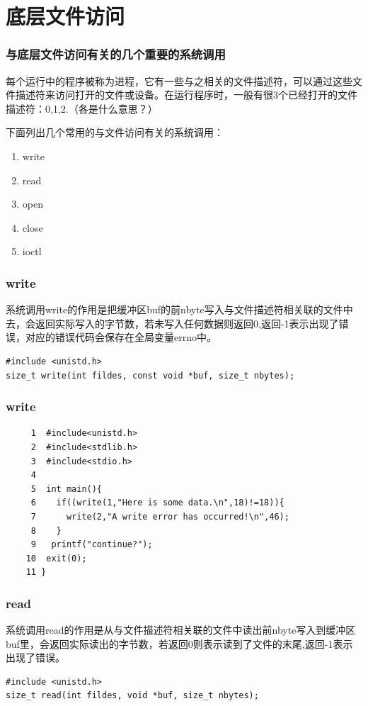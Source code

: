 \documentclass{beamer}
\begin{document}
\section{底层文件访问}
\begin{frame}
\frametitle{与底层文件访问有关的几个重要的系统调用}
每个运行中的程序被称为进程，它有一些与之相关的文件描述符，可以通过这些文件描述符来访问打开的文件或设备。在运行程序时，一般有很3个已经打开的文件描述符：0,1,2.（各是什么意思？）

下面列出几个常用的与文件访问有关的系统调用：
\begin{enumerate}
\item
write
\item
read
\item
open
\item
close
\item
ioctl

\end{enumerate}


\end{frame}
\begin{frame}[fragile]
\frametitle{write}
系统调用write的作用是把缓冲区buf的前nbyte写入与文件描述符相关联的文件中去，会返回实际写入的字节数，若未写入任何数据则返回0,返回-1表示出现了错误，对应的错误代码会保存在全局变量errno中。
\begin{example}[write系统调用的原型]
\begin{verbatim}
#include <unistd.h>
size_t write(int fildes, const void *buf, size_t nbytes);
\end{verbatim}
\end{example}

\end{frame}



\begin{frame}[fragile]
\frametitle{write}
\begin{example}[write系统调用的使用实例]
\begin{verbatim}
     1  #include<unistd.h>
     2  #include<stdlib.h>
     3  #include<stdio.h>
     4
     5  int main(){
     6    if((write(1,"Here is some data.\n",18)!=18)){
     7      write(2,"A write error has occurred!\n",46);
     8    }
     9   printf("continue?");
    10  exit(0);
    11 }
\end{verbatim}
\end{example}

\end{frame}

\begin{frame}[fragile]
\frametitle{read}
系统调用read的作用是从与文件描述符相关联的文件中读出前nbyte写入到缓冲区buf里，会返回实际读出的字节数，若返回0则表示读到了文件的末尾,返回-1表示出现了错误。
\begin{example}[read系统调用的原型]
\begin{verbatim}
#include <unistd.h>
size_t read(int fildes, void *buf, size_t nbytes);
\end{verbatim}
\end{example}

\end{frame}
\end{document}
